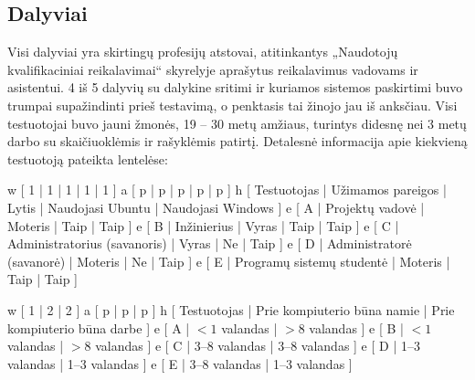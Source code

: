 \subsection{Dalyviai}

Visi dalyviai yra skirtingų profesijų atstovai, atitinkantys
„Naudotojų kvalifikaciniai reikalavimai“ skyrelyje aprašytus reikalavimus
vadovams ir asistentui. 4 iš 5 dalyvių su dalykine sritimi ir kuriamos
sistemos paskirtimi buvo trumpai supažindinti prieš testavimą, o
penktasis tai žinojo jau iš anksčiau. Visi testuotojai buvo jauni žmonės,
19 – 30 metų amžiaus, turintys didesnę nei 3 metų darbo su skaičiuoklėmis
ir rašyklėmis patirtį. Detalesnė informacija apie kiekvieną testuotoją
pateikta lentelėse:

\xtable
{
  w [ 1 | 1 | 1 | 1 | 1 ]
  a [ p | p | p | p | p ]
  h [
    Testuotojas |
    Užimamos pareigos |
    Lytis |
    Naudojasi Ubuntu |
    Naudojasi Windows
    ]
  e [ A | Projektų vadovė | Moteris | Taip | Taip ]
  e [ B | Inžinierius | Vyras | Taip | Taip ]
  e [ C | Administratorius (savanoris) | Vyras | Ne | Taip ]
  e [ D | Administratorė (savanorė) | Moteris | Ne | Taip ]
  e [ E | Programų sistemų studentė | Moteris | Taip | Taip ]
}

\xtable
{
  w [ 1 | 2 | 2 ]
  a [ p | p | p ]
  h [
    Testuotojas |
    Prie kompiuterio būna namie |
    Prie kompiuterio būna darbe
    ]
  e [ A | $< 1$ valandas | $> 8$ valandas ]
  e [ B | $< 1$ valandas | $> 8$ valandas ]
  e [ C | 3–8 valandas   | 3–8 valandas   ]
  e [ D | 1–3 valandas   | 1–3 valandas   ]
  e [ E | 3–8 valandas   | 1–3 valandas   ]
}
